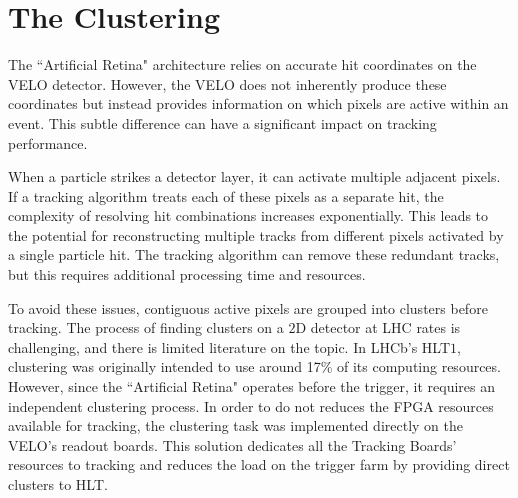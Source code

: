 



\section{The Clustering}

The ``Artificial Retina" architecture relies on accurate hit coordinates on the VELO detector. However, the VELO does not inherently produce these coordinates but instead provides information on which pixels are active within an event. This subtle difference can have a significant impact on tracking performance.

When a particle strikes a detector layer, it can activate multiple adjacent pixels. If a tracking algorithm treats each of these pixels as a separate hit, the complexity of resolving hit combinations increases exponentially. This leads to the potential for reconstructing multiple tracks from different pixels activated by a single particle hit. The tracking algorithm can remove these redundant tracks, but this requires additional processing time and resources.

To avoid these issues, contiguous active pixels are grouped into clusters before tracking. The process of finding clusters on a $2$D detector at LHC rates is challenging, and there is limited literature on the topic. In LHCb's HLT$1$, clustering was originally intended to use around 17\% of its computing resources. However, since the ``Artificial Retina" operates before the trigger, it requires an independent clustering process. In order to do not reduces the FPGA resources available for tracking, the clustering task was implemented directly on the VELO's readout boards. This solution dedicates all the Tracking Boards' resources to tracking and reduces the load on the trigger farm by providing direct clusters to HLT.

